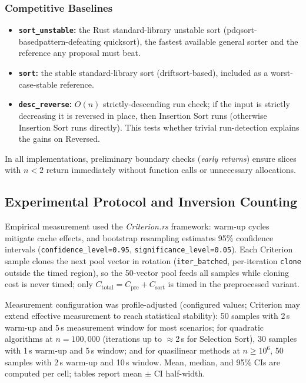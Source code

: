\documentclass[namedate,webpdf,contemporary,large]{TBench-template}%
\theoremstyle{thmstyleone}%
\theoremstyle{thmstyletwo}%
\theoremstyle{thmstylethree}%
\begin{document}
\subsubsection{Competitive Baselines}
\begin{itemize}
\item \textbf{\texttt{sort\_unstable}:} the Rust standard-library unstable sort (pdqsort-basedpattern-defeating quicksort), the fastest available general sorter and the reference any proposal must beat.
\item \textbf{\texttt{sort}:} the stable standard-library sort (driftsort-based), included as a worst-case-stable reference.
\item \textbf{\texttt{desc\_reverse}:} $O(n)$ strictly-descending run check; if the input is strictly decreasing it is reversed in place, then Insertion Sort runs (otherwise Insertion Sort runs directly). This tests whether trivial run-detection explains the gains on Reversed.
\end{itemize}
In all implementations, preliminary boundary checks (\emph{early returns}) ensure slices with $n<2$ return immediately without function calls or unnecessary allocations.

\subsection{Experimental Protocol and Inversion Counting}
Empirical measurement used the \emph{Criterion.rs} framework: warm-up cycles mitigate cache effects, and bootstrap resampling estimates 95\% confidence intervals (\texttt{confidence\_level=0.95}, \texttt{significance\_level=0.05}). Each Criterion sample clones the next pool vector in rotation (\texttt{iter\_batched}, per-iteration \texttt{clone} outside the timed region), so the 50-vector pool feeds all samples while cloning cost is never timed; only $C_{\text{total}} = C_{\text{pre}} + C_{\text{sort}}$ is timed in the preprocessed variant.

Measurement configuration was profile-adjusted (configured values; Criterion may extend effective measurement to reach statistical stability): 50 samples with 2\,s warm-up and 5\,s measurement window for most scenarios; for quadratic algorithms at $n=100{,}000$ (iterations up to $\approx$2\,s for Selection Sort), 30 samples with 1\,s warm-up and 5\,s window; and for quasilinear methods at $n\ge10^6$, 50 samples with 2\,s warm-up and 10\,s window. Mean, median, and 95\% CIs are computed per cell; tables report mean $\pm$ CI half-width.
\end{document}
